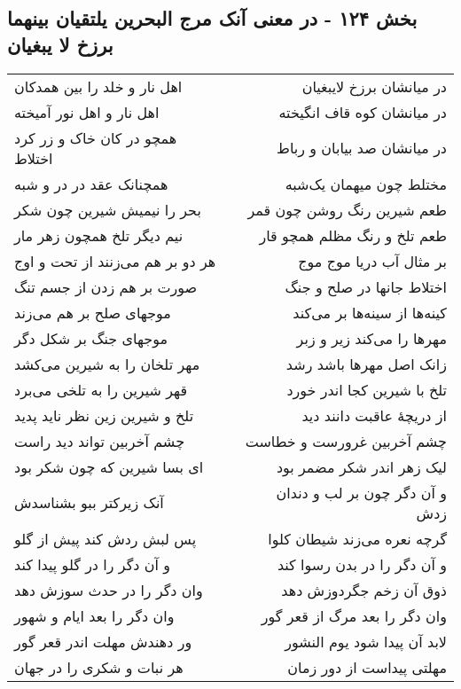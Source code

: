\begin{center}
\section*{بخش ۱۲۴ - در معنی آنک مرج البحرین یلتقیان بینهما برزخ لا یبغیان}
\label{sec:sh124}
\begin{longtable}{l p{0.5cm} r}
اهل نار و خلد را بین همدکان
&&
در میانشان برزخ لایبغیان
\\
اهل نار و اهل نور آمیخته
&&
در میانشان کوه قاف انگیخته
\\
همچو در کان خاک و زر کرد اختلاط
&&
در میانشان صد بیابان و رباط
\\
همچنانک عقد در در و شبه
&&
مختلط چون میهمان یک‌شبه
\\
بحر را نیمیش شیرین چون شکر
&&
طعم شیرین رنگ روشن چون قمر
\\
نیم دیگر تلخ همچون زهر مار
&&
طعم تلخ و رنگ مظلم همچو قار
\\
هر دو بر هم می‌زنند از تحت و اوج
&&
بر مثال آب دریا موج موج
\\
صورت بر هم زدن از جسم تنگ
&&
اختلاط جانها در صلح و جنگ
\\
موجهای صلح بر هم می‌زند
&&
کینه‌ها از سینه‌ها بر می‌کند
\\
موجهای جنگ بر شکل دگر
&&
مهرها را می‌کند زیر و زبر
\\
مهر تلخان را به شیرین می‌کشد
&&
زانک اصل مهرها باشد رشد
\\
قهر شیرین را به تلخی می‌برد
&&
تلخ با شیرین کجا اندر خورد
\\
تلخ و شیرین زین نظر ناید پدید
&&
از دریچهٔ عاقبت دانند دید
\\
چشم آخربین تواند دید راست
&&
چشم آخربین غرورست و خطاست
\\
ای بسا شیرین که چون شکر بود
&&
لیک زهر اندر شکر مضمر بود
\\
آنک زیرکتر ببو بشناسدش
&&
و آن دگر چون بر لب و دندان زدش
\\
پس لبش ردش کند پیش از گلو
&&
گرچه نعره می‌زند شیطان کلوا
\\
و آن دگر را در گلو پیدا کند
&&
و آن دگر را در بدن رسوا کند
\\
وان دگر را در حدث سوزش دهد
&&
ذوق آن زخم جگردوزش دهد
\\
وان دگر را بعد ایام و شهور
&&
وان دگر را بعد مرگ از قعر گور
\\
ور دهندش مهلت اندر قعر گور
&&
لابد آن پیدا شود یوم النشور
\\
هر نبات و شکری را در جهان
&&
مهلتی پیداست از دور زمان
\\

\end{longtable}
\end{center}
